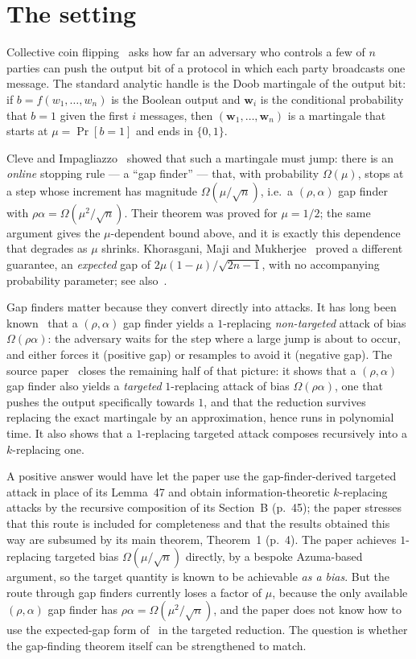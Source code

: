 \documentclass{aicr-conjecture}
\newcommand{\wv}{\mathbf{w}}
\begin{document}
\section{The setting}\label{sec:setting}

Collective coin flipping~\cite{BOL90} asks how far an adversary who
controls a few of $n$ parties can push the output bit of a protocol in
which each party broadcasts one message. The standard analytic handle is
the Doob martingale of the output bit: if $b = f(w_1,\dots,w_n)$ is the
Boolean output and $\wv_i$ is the conditional probability that $b=1$
given the first $i$ messages, then $(\wv_1,\dots,\wv_n)$ is a martingale
that starts at $\mu = \Pr[b=1]$ and ends in $\{0,1\}$.

Cleve and Impagliazzo~\cite{CI93} showed that such a martingale must
jump: there is an \emph{online} stopping rule --- a ``gap finder'' ---
that, with probability $\Omega(\mu)$, stops at a step whose increment
has magnitude $\Omega(\mu/\sqrt{n})$, i.e.\ a $(\rho,\alpha)$ gap finder
with $\rho\alpha = \Omega(\mu^{2}/\sqrt{n})$. Their theorem was proved
for $\mu = 1/2$; the same argument gives the $\mu$-dependent bound
above, and it is exactly this dependence that degrades as $\mu$ shrinks.
Khorasgani, Maji and Mukherjee~\cite{KMM19} proved a different
guarantee, an \emph{expected} gap of $2\mu(1-\mu)/\sqrt{2n-1}$, with no
accompanying probability parameter; see also~\cite{KMW21}.

Gap finders matter because they convert directly into attacks. It has
long been known~\cite{CI93,KMM19} that a $(\rho,\alpha)$ gap finder
yields a $1$-replacing \emph{non-targeted} attack of bias
$\Omega(\rho\alpha)$: the adversary waits for the step where a large
jump is about to occur, and either forces it (positive gap) or resamples
to avoid it (negative gap). The source paper~\cite{EGMM21} closes the
remaining half of that picture: it shows that a $(\rho,\alpha)$ gap
finder also yields a \emph{targeted} $1$-replacing attack of bias
$\Omega(\rho\alpha)$, one that pushes the output specifically
towards $1$, and that the reduction survives replacing the exact
martingale by an approximation, hence runs in polynomial time. It also
shows that a $1$-replacing targeted attack composes recursively into a
$k$-replacing one.

A positive answer would have let the paper use the gap-finder-derived
targeted attack in place of its Lemma~47 and obtain
information-theoretic $k$-replacing attacks by the recursive
composition of its Section~B (p.~45); the paper stresses that this route
is included for completeness and that the results obtained this way are
subsumed by its main theorem, Theorem~1 (p.~4). The paper achieves
$1$-replacing targeted bias $\Omega(\mu/\sqrt{n})$ directly, by a
bespoke Azuma-based argument, so the target quantity is known to be
achievable \emph{as a bias}. But the route through gap finders currently
loses a factor of $\mu$, because the only available $(\rho,\alpha)$ gap
finder has $\rho\alpha = \Omega(\mu^{2}/\sqrt{n})$, and the paper does
not know how to use the expected-gap form of~\cite{KMM19} in the
targeted reduction. The question is whether the gap-finding theorem
itself can be strengthened to match.
\end{document}

